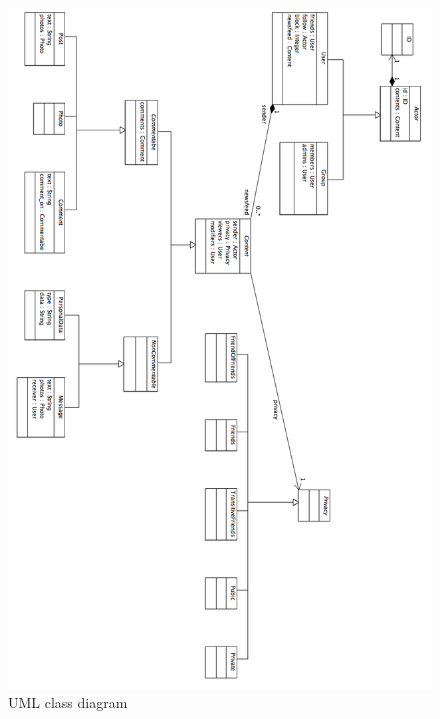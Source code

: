 \documentclass[pdftex,12pt,a4paper]{scrartcl}
\begin{document}
\begin{figure}
\centering
\includegraphics[scale=0.44]{classdiagram.png}
\caption{UML class diagram}
\label{class_diagram}
\end{figure}
\end{document}
